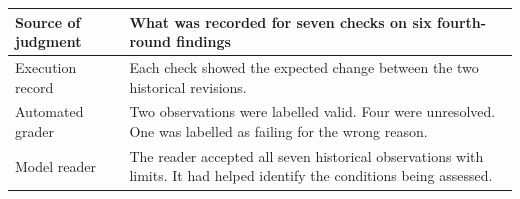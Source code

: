 \begin{tabularx}{\linewidth}{@{}p{.22\linewidth}X@{}}
\toprule
Source of judgment & What was recorded for seven checks on six fourth-round findings \\
\midrule
Execution record & Each check showed the expected change between the two historical revisions. \\
\addlinespace
Automated grader & Two observations were labelled valid. Four were unresolved. One was labelled as failing for the wrong reason. \\
\addlinespace
Model reader & The reader accepted all seven historical observations with limits. It had helped identify the conditions being assessed. \\
\bottomrule
\end{tabularx}
